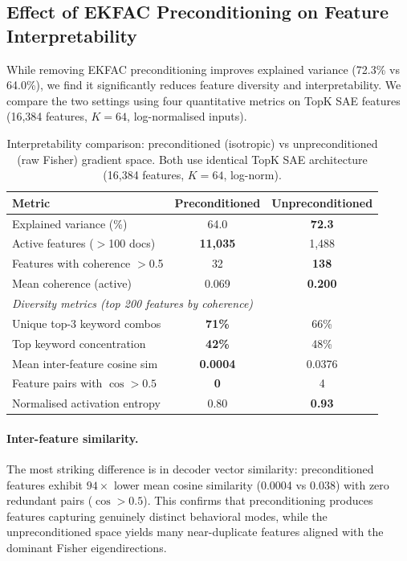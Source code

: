 
\subsection{Effect of EKFAC Preconditioning on Feature Interpretability}

While removing EKFAC preconditioning improves explained variance (72.3\% vs 64.0\%), we find it significantly reduces feature diversity and interpretability. We compare the two settings using four quantitative metrics on TopK SAE features (16{,}384 features, $K{=}64$, log-normalised inputs).

\begin{table}[t]
\centering
\caption{Interpretability comparison: preconditioned (isotropic) vs unpreconditioned (raw Fisher) gradient space. Both use identical TopK SAE architecture (16{,}384 features, $K{=}64$, log-norm).}
\label{tab:preconditioning-interpretability}
\small
\begin{tabular}{lcc}
\toprule
\textbf{Metric} & \textbf{Preconditioned} & \textbf{Unpreconditioned} \\
\midrule
Explained variance (\%)          & 64.0  & \textbf{72.3} \\
Active features ($>$100 docs)    & \textbf{11{,}035} & 1{,}488 \\
Features with coherence $>$0.5   & 32    & \textbf{138} \\
Mean coherence (active)          & 0.069 & \textbf{0.200} \\
\midrule
\multicolumn{3}{l}{\textit{Diversity metrics (top 200 features by coherence)}} \\
\midrule
Unique top-3 keyword combos      & \textbf{71\%} & 66\% \\
Top keyword concentration        & \textbf{42\%} & 48\% \\
Mean inter-feature cosine sim    & \textbf{0.0004} & 0.0376 \\
Feature pairs with $\cos > 0.5$  & \textbf{0} & 4 \\
Normalised activation entropy    & 0.80  & \textbf{0.93} \\
\bottomrule
\end{tabular}
\end{table}

\paragraph{Inter-feature similarity.} The most striking difference is in decoder vector similarity: preconditioned features exhibit $94\times$ lower mean cosine similarity (0.0004 vs 0.038) with zero redundant pairs ($\cos > 0.5$). This confirms that preconditioning produces features capturing genuinely distinct behavioral modes, while the unpreconditioned space yields many near-duplicate features aligned with the dominant Fisher eigendirections.

